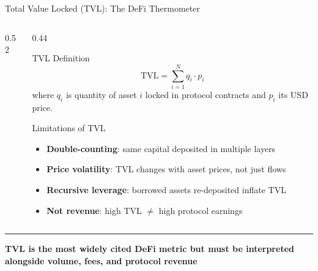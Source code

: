 \documentclass[8pt,aspectratio=169]{beamer}
\newcommand{\bottomnote}[1]{\vfill\vspace{-2mm}\textcolor{mllavender2}{\rule{\textwidth}{0.4pt}}\vspace{1mm}\footnotesize\textbf{#1}}
\begin{document}
\begin{frame}{Total Value Locked (TVL): The DeFi Thermometer}
  \begin{columns}[T]
    \begin{column}{0.52\textwidth}
    \end{column}
    \begin{column}{0.44\textwidth}
      \begin{block}{TVL Definition}
        \[
          \mathrm{TVL} = \sum_{i=1}^{N} q_i \cdot p_i
        \]
        where $q_i$ is quantity of asset $i$ locked in protocol contracts and $p_i$ its USD price.
      \end{block}
      \vspace{3mm}
      \begin{block}{Limitations of TVL}
        \begin{itemize}\setlength\itemsep{2pt}
          \item \textbf{Double-counting}: same capital deposited in multiple layers
          \item \textbf{Price volatility}: TVL changes with asset prices, not just flows
          \item \textbf{Recursive leverage}: borrowed assets re-deposited inflate TVL
          \item \textbf{Not revenue}: high TVL $\neq$ high protocol earnings
        \end{itemize}
      \end{block}
    \end{column}
  \end{columns}
  \bottomnote{TVL is the most widely cited DeFi metric but must be interpreted alongside volume, fees, and protocol revenue}
\end{frame}
\end{document}
